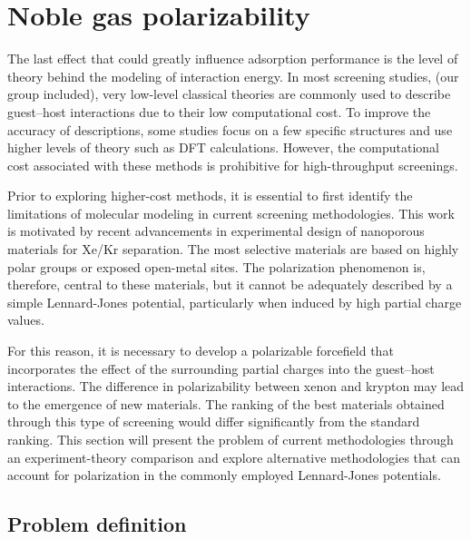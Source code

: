 \documentclass[main]{subfiles}
\begin{document}
\section{Noble gas polarizability}

The last effect that could greatly influence adsorption performance is the level of theory behind the modeling of interaction energy. In most screening studies, (our group included), very low-level classical theories are commonly used to describe guest--host interactions due to their low computational cost. To improve the accuracy of descriptions, some studies focus on a few specific structures and use higher levels of theory such as DFT calculations. However, the computational cost associated with these methods is prohibitive for high-throughput screenings.

Prior to exploring higher-cost methods, it is essential to first identify the limitations of molecular modeling in current screening methodologies. This work is motivated by recent advancements in experimental design of nanoporous materials for Xe/Kr separation. The most selective materials are based on highly polar groups or exposed open-metal sites.\autocite{Li_2019,Pei_2022} The polarization phenomenon is, therefore, central to these materials, but it cannot be adequately described by a simple Lennard-Jones potential, particularly when induced by high partial charge values.

For this reason, it is necessary to develop a polarizable forcefield that incorporates the effect of the surrounding partial charges into the guest--host interactions. The difference in polarizability between xenon and krypton may lead to the emergence of new materials. The ranking of the best materials obtained through this type of screening would differ significantly from the standard ranking. This section will present the problem of current methodologies through an experiment-theory comparison and explore alternative methodologies that can account for polarization in the commonly employed Lennard-Jones potentials.

\subsection{Problem definition}
\end{document}
